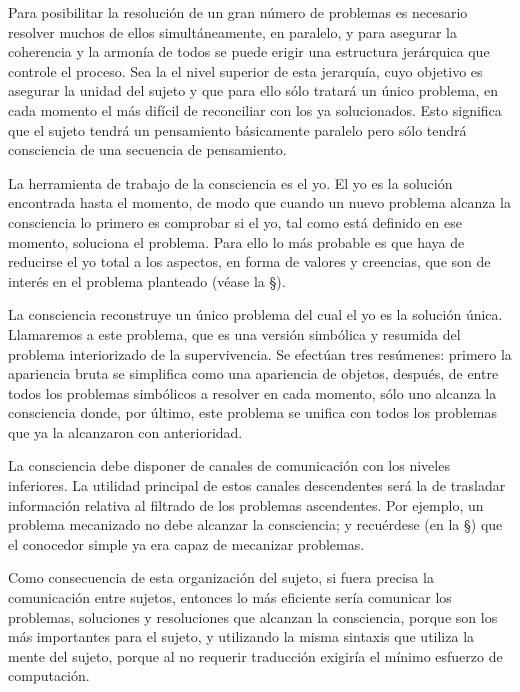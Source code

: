 Para posibilitar la resolución de un gran número de problemas es necesario
resolver muchos de ellos simultáneamente, en paralelo, y para asegurar la
coherencia y la armonía de todos se puede erigir una estructura jerárquica
que controle el proceso.  Sea la  el nivel superior
de esta jerarquía, cuyo objetivo es asegurar la unidad del sujeto y que para
ello sólo tratará un único problema, en cada momento el más difícil de
reconciliar con los ya solucionados.  Esto significa que el sujeto tendrá un
pensamiento básicamente paralelo pero sólo tendrá consciencia de una
secuencia de pensamiento.

La herramienta de trabajo de la consciencia es el yo.  El yo es la solución
encontrada hasta el momento, de modo que cuando un nuevo problema alcanza la
consciencia lo primero es comprobar si el yo, tal como está definido en ese
momento, soluciona el problema.  Para ello lo más probable es que haya de
reducirse el yo total a los aspectos, en forma de valores y creencias, que
son de interés en el problema planteado (véase la
\S{}).

La consciencia reconstruye un único problema del cual el yo es la solución
única. Llamaremos  a este problema, que es
una versión simbólica y resumida del problema interiorizado de la
supervivencia. Se efectúan tres resúmenes: primero la apariencia bruta se
simplifica como una apariencia de objetos, después, de entre todos los
problemas simbólicos a resolver en cada momento, sólo uno alcanza la
consciencia donde, por último, este problema se unifica con todos los
problemas que ya la alcanzaron con anterioridad.

La consciencia debe disponer de canales de comunicación con los niveles
inferiores.  La utilidad principal de estos canales descendentes será la de
trasladar información relativa al filtrado de los problemas ascendentes. Por
ejemplo, un problema mecanizado no debe alcanzar la consciencia; y
recuérdese (en la \S{}) que el conocedor simple ya era
capaz de mecanizar problemas.

Como consecuencia de esta organización del sujeto, si fuera precisa la
comunicación entre sujetos, entonces lo más eficiente sería comunicar
los problemas, soluciones y resoluciones que alcanzan la consciencia,
porque son los más importantes para el sujeto, y utilizando la misma
sintaxis que utiliza la mente del sujeto, porque al no requerir
traducción exigiría el mínimo esfuerzo de computación.

